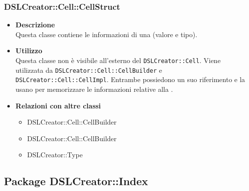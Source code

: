  \subsubsection{DSLCreator::Cell::CellStruct}
                    \begin{itemize}
                        \item \textbf{Descrizione} \hfill \\
                            Questa classe contiene le informazioni di una  (valore e tipo).
                        \item \textbf{Utilizzo} \hfill \\
                            Questa classe non è visibile all'esterno del  \texttt{DSLCreator::Cell}. Viene utilizzata da \texttt{DSLCreator::Cell::CellBuilder} e \texttt{DSLCreator::Cell::CellImpl}. Entrambe possiedono un suo riferimento e la usano per memorizzare le informazioni relative alla .
                        \item \textbf{Relazioni con altre classi}
                            \begin{itemize}
                              \item DSLCreator::Cell::CellBuilder
                              \item DSLCreator::Cell::CellBuilder
                              \item DSLCreator::Type
                            \end{itemize}
                    \end{itemize}

\subsection{Package DSLCreator::Index}
